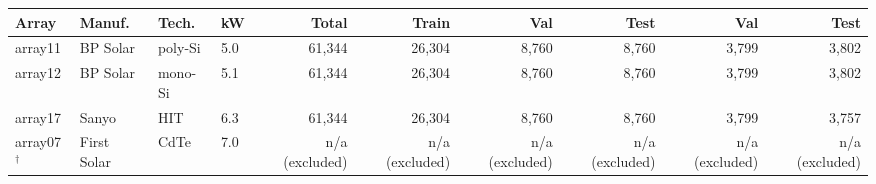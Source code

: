 \begin{table}[t]
\begin{tabular}{llll rrrr rr}
    \cmidrule(lr){5-8} \cmidrule(lr){9-10}
    Array & Manuf. & Tech. & kW & Total & Train & Val & Test & Val & Test \\
    \midrule
    array11 & BP Solar & poly-Si & 5.0 & 61,344 & 26,304 & 8,760 & 8,760 & 3,799 & 3,802 \\
    array12 & BP Solar & mono-Si & 5.1 & 61,344 & 26,304 & 8,760 & 8,760 & 3,799 & 3,802 \\
    array17 & Sanyo & HIT & 6.3 & 61,344 & 26,304 & 8,760 & 8,760 & 3,799 & 3,757 \\
    \midrule
    array07$^{\dagger}$ & First Solar & CdTe & 7.0 & n/a (excluded) & n/a (excluded) & n/a (excluded) & n/a (excluded) & n/a (excluded) & n/a (excluded) \\
    \bottomrule
  \end{tabular}
\end{table}
